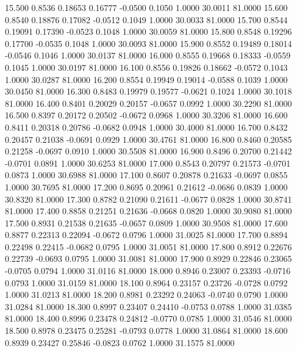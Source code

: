   15.500   0.8536   0.18653   0.16777  -0.0500   0.1050   1.0000  30.0011  81.0000
  15.600   0.8540   0.18876   0.17082  -0.0512   0.1049   1.0000  30.0033  81.0000
  15.700   0.8544   0.19091   0.17390  -0.0523   0.1048   1.0000  30.0059  81.0000
  15.800   0.8548   0.19296   0.17700  -0.0535   0.1048   1.0000  30.0093  81.0000
  15.900   0.8552   0.19489   0.18014  -0.0546   0.1046   1.0000  30.0137  81.0000
  16.000   0.8555   0.19668   0.18333  -0.0559   0.1045   1.0000  30.0197  81.0000
  16.100   0.8556   0.19826   0.18662  -0.0572   0.1043   1.0000  30.0287  81.0000
  16.200   0.8554   0.19949   0.19014  -0.0588   0.1039   1.0000  30.0450  81.0000
  16.300   0.8483   0.19979   0.19577  -0.0621   0.1024   1.0000  30.1018  81.0000
  16.400   0.8401   0.20029   0.20157  -0.0657   0.0992   1.0000  30.2290  81.0000
  16.500   0.8397   0.20172   0.20502  -0.0672   0.0968   1.0000  30.3206  81.0000
  16.600   0.8411   0.20318   0.20786  -0.0682   0.0948   1.0000  30.4000  81.0000
  16.700   0.8432   0.20457   0.21038  -0.0691   0.0929   1.0000  30.4761  81.0000
  16.800   0.8460   0.20585   0.21258  -0.0697   0.0910   1.0000  30.5508  81.0000
  16.900   0.8496   0.20700   0.21442  -0.0701   0.0891   1.0000  30.6253  81.0000
  17.000   0.8543   0.20797   0.21573  -0.0701   0.0873   1.0000  30.6988  81.0000
  17.100   0.8607   0.20878   0.21633  -0.0697   0.0855   1.0000  30.7695  81.0000
  17.200   0.8695   0.20961   0.21612  -0.0686   0.0839   1.0000  30.8320  81.0000
  17.300   0.8782   0.21090   0.21611  -0.0677   0.0828   1.0000  30.8741  81.0000
  17.400   0.8858   0.21251   0.21636  -0.0668   0.0820   1.0000  30.9080  81.0000
  17.500   0.8931   0.21538   0.21635  -0.0657   0.0809   1.0000  30.9508  81.0000
  17.600   0.8877   0.22313   0.22094  -0.0672   0.0796   1.0000  31.0025  81.0000
  17.700   0.8894   0.22498   0.22415  -0.0682   0.0795   1.0000  31.0051  81.0000
  17.800   0.8912   0.22676   0.22739  -0.0693   0.0795   1.0000  31.0081  81.0000
  17.900   0.8929   0.22846   0.23065  -0.0705   0.0794   1.0000  31.0116  81.0000
  18.000   0.8946   0.23007   0.23393  -0.0716   0.0793   1.0000  31.0159  81.0000
  18.100   0.8964   0.23157   0.23726  -0.0728   0.0792   1.0000  31.0213  81.0000
  18.200   0.8981   0.23292   0.24063  -0.0740   0.0790   1.0000  31.0284  81.0000
  18.300   0.8997   0.23407   0.24410  -0.0753   0.0788   1.0000  31.0385  81.0000
  18.400   0.8996   0.23478   0.24812  -0.0770   0.0785   1.0000  31.0546  81.0000
  18.500   0.8978   0.23475   0.25281  -0.0793   0.0778   1.0000  31.0864  81.0000
  18.600   0.8939   0.23427   0.25846  -0.0823   0.0762   1.0000  31.1575  81.0000
